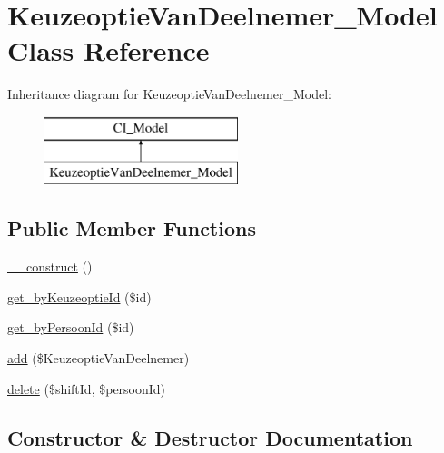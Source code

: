 \hypertarget{class_keuzeoptie_van_deelnemer___model}{}\section{Keuzeoptie\+Van\+Deelnemer\+\_\+\+Model Class Reference}
\label{class_keuzeoptie_van_deelnemer___model}
Inheritance diagram for Keuzeoptie\+Van\+Deelnemer\+\_\+\+Model\+:\begin{figure}[H]
\begin{center}
\leavevmode
\includegraphics[height=2.000000cm]{class_keuzeoptie_van_deelnemer___model}
\end{center}
\end{figure}
\subsection*{Public Member Functions}
\begin{DoxyCompactItemize}
\item 
\mbox{\hyperlink{class_keuzeoptie_van_deelnemer___model_a095c5d389db211932136b53f25f39685}{\+\_\+\+\_\+construct}} ()
\item 
\mbox{\hyperlink{class_keuzeoptie_van_deelnemer___model_a5240031a73a1db935718f12ab29d80ad}{get\+\_\+by\+Keuzeoptie\+Id}} (\$id)
\item 
\mbox{\hyperlink{class_keuzeoptie_van_deelnemer___model_aa04bd86e024fed6b73b051c9cbb9ec52}{get\+\_\+by\+Persoon\+Id}} (\$id)
\item 
\mbox{\hyperlink{class_keuzeoptie_van_deelnemer___model_a59e9964aa59737ee3789f9458fdc4ee2}{add}} (\$Keuzeoptie\+Van\+Deelnemer)
\item 
\mbox{\hyperlink{class_keuzeoptie_van_deelnemer___model_a0b51c4f3d41dcc04514f7ea8405f4ed3}{delete}} (\$shift\+Id, \$persoon\+Id)
\end{DoxyCompactItemize}


\subsection{Constructor \& Destructor Documentation}
\mbox{\label{class_keuzeoptie_van_deelnemer___model_a095c5d389db211932136b53f25f39685}} 
